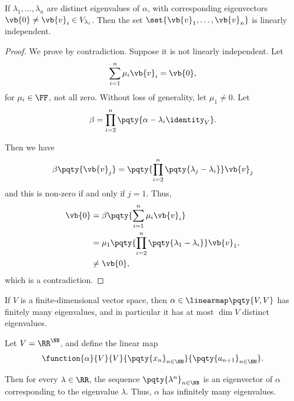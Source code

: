 \begin{lemma}
    \label{lem:eigenvectors-distinct-eigenvalues-linearly-independent}%
    If \(\lambda_1, \ldots, \lambda_n\) are distinct eigenvalues of \(\alpha\), with corresponding eigenvectors \(\vb{0} \neq \vb{v}_i \in V_{\lambda_i}\). Then the set \(\set{\vb{v}_1, \ldots, \vb{v}_n}\) is linearly independent.
\end{lemma}

\begin{proof}
    We prove by contradiction. Suppose it is not linearly independent. Let
    \[
        \sum_{i = 1}^{n} \mu_i \vb{v}_i = \vb{0},
    \]
    for \(\mu_i \in \FF\), not all zero. Without loss of generality, let \(\mu_1 \neq 0\). Let
    \[
        \beta = \prod_{i = 2}^{n} \pqty{\alpha - \lambda_i \identity_V}.
    \]

    Then we have
    \[
        \beta\pqty{\vb{v}_j} = \pqty{\prod_{i = 2}^{n} \pqty{\lambda_j - \lambda_i}} \vb{v}_j
    \]
    and this is non-zero if and only if \(j = 1\). Thus,
    \begin{align*}
        \vb{0} &= \beta\pqty{\sum_{i = 1}^{n} \mu_i \vb{v}_i} \\
        &= \mu_1 \pqty{\prod_{i = 2}^{n} \pqty{\lambda_1 - \lambda_i}} \vb{v}_1, \\
        &\neq \vb{0},
    \end{align*}
    which is a contradiction.
\end{proof}

\begin{corollary}
    If \(V\) is a finite-dimensional vector space, then \(\alpha \in \linearmap\pqty{V, V}\) has finitely many eigenvalues, and in particular it has at most \(\dim V\) distinct eigenvalues.
\end{corollary}

\begin{example}
    Let \(V = \RR^{\NN}\), and define the linear map
    \[
        \function{\alpha}{V}{V}{\pqty{x_n}_{n \in \NN}}{\pqty{a_{n + 1}}_{n \in \NN}}.
    \]

    Then for every \(\lambda \in \RR\), the sequence \(\pqty{\lambda^n}_{n \in \NN}\) is an eigenvector of \(\alpha\) corresponding to the eigenvalue \(\lambda\). Thus, \(\alpha\) has infinitely many eigenvalues.
\end{example}

